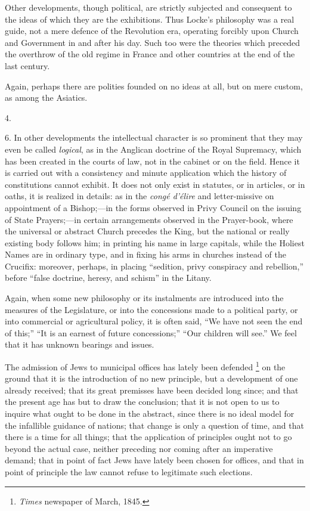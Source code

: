Other developments, though political, are strictly
subjected and consequent to the ideas of which they are
the exhibitions. Thus Locke's philosophy was a real
guide, not a mere defence of the Revolution era,
operating forcibly upon Church and Government in and
after his day. Such too were the theories which preceded
the overthrow of the old regime in France and other
countries at the end of the last century.

Again, perhaps there are polities founded on no ideas
at all, but on mere custom, as among the Asiatics.

4.

6. In other developments the intellectual character is
so prominent that they may even be called \emph{logical},
as in the Anglican doctrine of the Royal Supremacy, which
has been created in the courts of law, not in the cabinet
or on the field. Hence it is carried out with a
consistency and minute application which the history of
constitutions cannot exhibit. It does not only exist in
statutes, or in articles, or in oaths, it is realized in
details: as in the \emph{congé d'élire} and
letter-missive on appointment of a Bishop;—in the
forms observed in Privy Council on the issuing of State
Prayers;—in certain arrangements observed in the
Prayer-book, where the universal or abstract Church
precedes the King, but the national or really existing
body follows him; in printing his name in large capitals,
while the Holiest Names are in ordinary type, and in
fixing his arms in churches instead of the Crucifix: moreover, perhaps, in placing ``sedition, privy
conspiracy and rebellion,'' before ``false
doctrine, heresy, and schism'' in the Litany.

Again, when some new philosophy or its instalments are
introduced into the measures of the Legislature, or into
the concessions made to a political party, or into
commercial or agricultural policy, it is often said,
``We have not seen the end of this;'' ``It is
an earnest of future concessions;'' ``Our
children will see.'' We feel that it has unknown
bearings and issues.

The admission of Jews to municipal offices has lately
been defended \footnote{\emph{Times} newspaper of
March, 1845.} on the ground that it is the introduction of no
new principle, but a development of one already received;
that its great premisses have been decided long since;
and that the present age has but to draw the conclusion;
that it is not open to us to inquire what ought to be
done in the abstract, since there is no ideal model for
the infallible guidance of nations; that change is only a
question of time, and that there is a time for all
things; that the application of principles ought not to
go beyond the actual case, neither preceding nor coming
after an imperative demand; that in point of fact Jews
have lately been chosen for offices, and that in point of
principle the law cannot refuse to legitimate such
elections.


